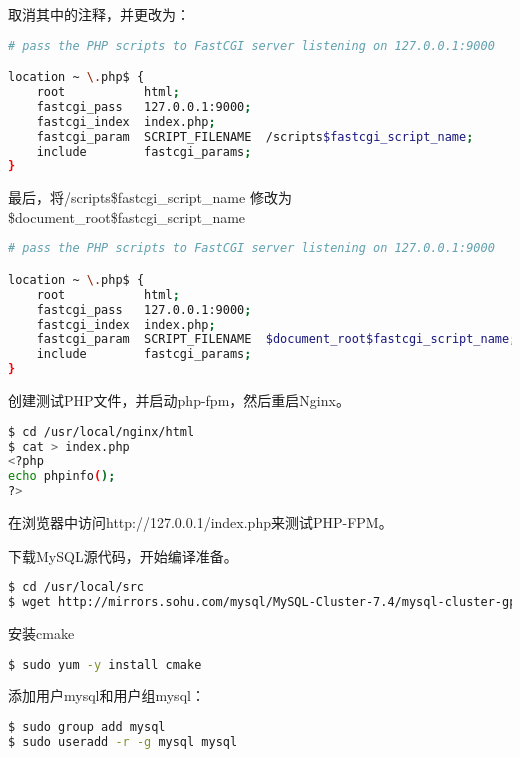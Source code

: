 取消其中的注释，并更改为：

\begin{lstlisting}[language=bash]
# pass the PHP scripts to FastCGI server listening on 127.0.0.1:9000

location ~ \.php$ {
    root           html;
    fastcgi_pass   127.0.0.1:9000;
    fastcgi_index  index.php;
    fastcgi_param  SCRIPT_FILENAME  /scripts$fastcgi_script_name;
    include        fastcgi_params;
}
\end{lstlisting}

最后，将/scripts\$fastcgi\_script\_name 修改为 \$document\_root\$fastcgi\_script\_name

\begin{lstlisting}[language=bash]
# pass the PHP scripts to FastCGI server listening on 127.0.0.1:9000

location ~ \.php$ {
    root           html;
    fastcgi_pass   127.0.0.1:9000;
    fastcgi_index  index.php;
    fastcgi_param  SCRIPT_FILENAME  $document_root$fastcgi_script_name;
    include        fastcgi_params;
}
\end{lstlisting}

创建测试PHP文件，并启动php-fpm，然后重启Nginx。


\begin{lstlisting}[language=bash]
$ cd /usr/local/nginx/html
$ cat > index.php
<?php
echo phpinfo();
?>

\end{lstlisting}

在浏览器中访问http://127.0.0.1/index.php来测试PHP-FPM。

下载MySQL源代码，开始编译准备。



\begin{lstlisting}[language=bash]
$ cd /usr/local/src
$ wget http://mirrors.sohu.com/mysql/MySQL-Cluster-7.4/mysql-cluster-gpl-7.4.7.tar.gz
\end{lstlisting}

安装cmake

\begin{lstlisting}[language=bash]
$ sudo yum -y install cmake
\end{lstlisting}

添加用户mysql和用户组mysql：


\begin{lstlisting}[language=bash]
$ sudo group add mysql
$ sudo useradd -r -g mysql mysql
\end{lstlisting}

